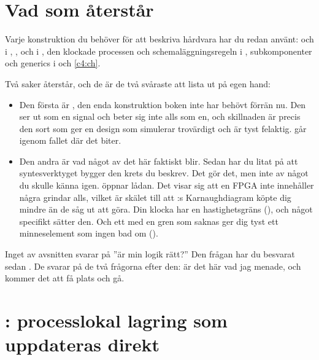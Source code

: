 
\section{Vad som återstår}
\label{c5:sec:intro}

Varje konstruktion du behöver för att beskriva hårdvara har du redan använt:  och
 i , ,  och  i
, den klockade processen och schemaläggningsregeln i ,
subkomponenter och generics i  och \ref{c4:ch}.

Två saker återstår, och de är de två svåraste att lista ut på egen hand:
\begin{itemize}
  \item Den första är , den enda konstruktion boken inte har behövt förrän nu. Den
    ser ut som en signal och beter sig inte alls som en, och skillnaden är precis den sort som ger
    en design som simulerar trovärdigt och är tyst felaktig.  går igenom
    fallet där det biter.
  \item Den andra är vad något av det här faktiskt blir. Sedan  har du litat på att
    syntesverktyget bygger den krets du beskrev. Det gör det, men inte av något du skulle känna
    igen.  öppnar lådan. Det visar sig att en FPGA inte innehåller några
    grindar alls, vilket är skälet till att :s Karnaughdiagram köpte dig mindre än
    de såg ut att göra. Din klocka har en hastighetsgräns (), och något
    specifikt sätter den. Och ett  med en gren som saknas ger dig tyst ett minneselement
    som ingen bad om ().
\end{itemize}

Inget av avsnitten svarar på ”är min logik rätt?” Den frågan har du besvarat sedan .
De svarar på de två frågorna efter den: är det här vad jag menade, och kommer det att få plats och
gå.

\section{: processlokal lagring som uppdateras direkt}
\label{c5:sec:variable}

